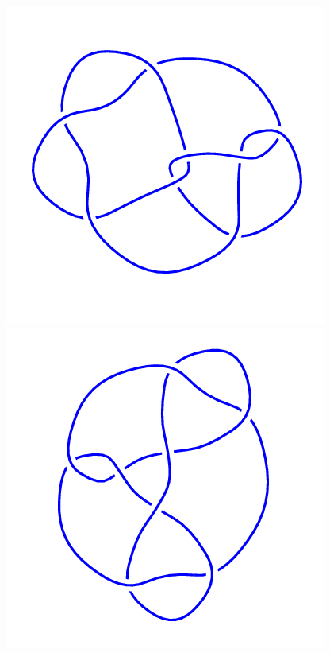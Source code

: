 \begin{figure}[H]
\begin{minipage}[b]{.18\linewidth}
	\end{minipage}
	\begin{minipage}[b]{.18\linewidth}
		\centering
		\includegraphics[width=\linewidth]{../data/8_19.png}
	\end{minipage}
	\begin{minipage}[b]{.18\linewidth}
		\centering
		\includegraphics[width=\linewidth]{../data/8_20.png}

\end{minipage}
\end{figure}
